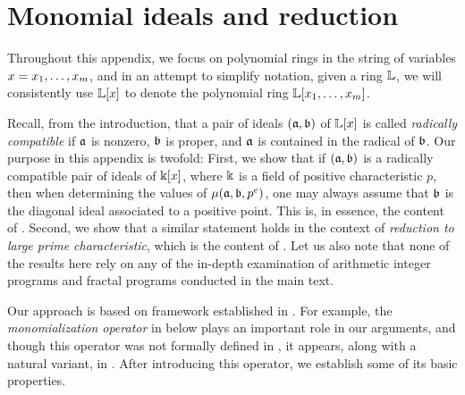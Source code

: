 \documentclass{amsart}
\begin{document}
\newpage
\appendix

\section{Monomial ideals and reduction}
\label{monomial-reduction: A}

Throughout this appendix, we focus on polynomial rings in the string of variables $x = x_1, \ldots, x_m$, and in an attempt to simplify notation,  given a ring $\mathbb{L}$, we will {consistently} use $\mathbb{L}[x]$ to denote the polynomial ring $\mathbb{L}[x_1, \ldots, x_m]$.

Recall, from {the introduction}, that a pair of ideals $(\mathfrak{a}, \mathfrak{b})$ of $\mathbb{L}[x]$ is called \emph{radically compatible}
if $\mathfrak{a}$ is nonzero, $\mathfrak{b}$ is proper, and $\mathfrak{a}$ is contained in the radical of $\mathfrak{b}$.  
Our purpose in this appendix is twofold:  First, we show that if $(\mathfrak{a}, \mathfrak{b})$ is a radically compatible pair of ideals of $\Bbbk[x]$, where $\Bbbk$ is a field of positive characteristic $p$, then when determining the values of $\mu(\mathfrak{a}, \mathfrak{b}, p^e)$, one may always assume that $\mathfrak{b}$ is the diagonal ideal associated to a positive point.   This is, in essence, the content of .  Second, we show that a similar statement holds in the context of \emph{reduction to large prime characteristic}, which is the content of .
Let us also note that none of the results here rely on any of the in-depth examination of arithmetic integer programs and fractal programs conducted in the main text. 

Our approach is based on framework established in \cite[Appendix]{budur+mustata+saito.roots_bs_polys_monomial}.  For example, the \emph{monomialization operator} in  below plays an important role in our arguments, and though this operator was not formally defined in \loccit, it appears, along with a natural variant, in \cite[Proposition 6.1 and Lemma 6.2]{budur+mustata+saito.roots_bs_polys_monomial}.  After introducing this operator, we establish some of its basic properties.
\end{document}
